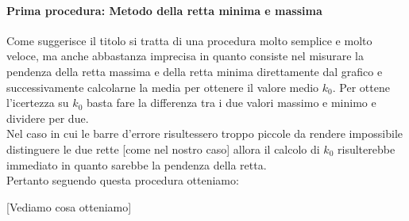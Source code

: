 \paragraph{Prima procedura: Metodo della retta minima e massima\\}
Come suggerisce il titolo si tratta di una procedura molto semplice e molto veloce, ma anche abbastanza imprecisa in quanto consiste nel misurare la pendenza della retta massima e della retta minima direttamente dal grafico e successivamente calcolarne la media per ottenere il valore medio $k_0$. Per ottene l'icertezza su $k_0$ basta fare la differenza tra i due valori massimo e minimo e dividere per due.\\
Nel caso in cui le barre d'errore risultessero troppo piccole da rendere impossibile distinguere le due rette [come nel nostro caso] allora il calcolo di $k_0$ risulterebbe immediato in quanto sarebbe la pendenza della retta.\\
Pertanto seguendo questa procedura otteniamo:

[Vediamo cosa otteniamo]

